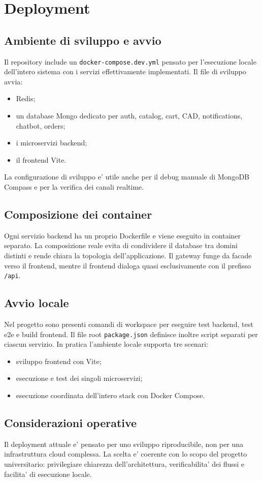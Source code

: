 \chapter{Deployment}

\section{Ambiente di sviluppo e avvio}

Il repository include un \texttt{docker-compose.dev.yml} pensato per l'esecuzione locale dell'intero sistema con i servizi effettivamente implementati. Il file di sviluppo avvia:

\begin{itemize}
\item Redis;
\item un database Mongo dedicato per auth, catalog, cart, CAD, notifications, chatbot, orders;
\item i microservizi backend;
\item il frontend Vite.
\end{itemize}

La configurazione di sviluppo e' utile anche per il debug manuale di MongoDB Compass e per la verifica dei canali realtime.

\section{Composizione dei container}

Ogni servizio backend ha un proprio Dockerfile e viene eseguito in container separato. La composizione reale evita di condividere il database tra domini distinti e rende chiara la topologia dell'applicazione. Il gateway funge da facade verso il frontend, mentre il frontend dialoga quasi esclusivamente con il prefisso \texttt{/api}.

\section{Avvio locale}

Nel progetto sono presenti comandi di workspace per eseguire test backend, test e2e e build frontend. Il file root \texttt{package.json} definisce inoltre script separati per ciascun servizio. In pratica l'ambiente locale supporta tre scenari:

\begin{itemize}
\item sviluppo frontend con Vite;
\item esecuzione e test dei singoli microservizi;
\item esecuzione coordinata dell'intero stack con Docker Compose.
\end{itemize}

\section{Considerazioni operative}

Il deployment attuale e' pensato per uno sviluppo riproducibile, non per una infrastruttura cloud complessa. La scelta e' coerente con lo scopo del progetto universitario: privilegiare chiarezza dell'architettura, verificabilita' dei flussi e facilita' di esecuzione locale.
